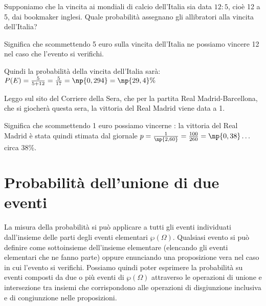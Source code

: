 \begin{exrig}
\begin{esempio}
Supponiamo che la vincita ai mondiali di calcio dell'Italia sia data $12:5$, cioè 12 a 5, dai bookmaker inglesi. Quale probabilità assegnano gli allibratori alla vincita dell'Italia?

Significa che scommettendo 5 euro sulla vincita dell'Italia ne possiamo vincere 12 nel caso che l'evento si verifichi.

Quindi la probabilità della vincita dell'Italia sarà:
$P(E)=\frac 5{5+12}=\frac 5{17}=\np{0,294}=\np{29,4}\%$
\end{esempio}

\begin{esempio}
Leggo sul sito del Corriere della Sera, che per la partita Real Madrid-Barcellona, che si giocherà questa sera, la vittoria del Real Madrid viene data  a 1.

Significa che scommettendo 1 euro possiamo vincerne : la vittoria del Real Madrid è stata quindi stimata dal giornale $p=\frac 1{\np{2,60}}=\frac{100}{260}=\np{0,38}\ldots$ circa 38\%.
\end{esempio}
\end{exrig}
\ovalbox{\risolvii \ref{ese:9.6}, \ref{ese:9.7}, \ref{ese:9.8}, \ref{ese:9.9}, \ref{ese:9.10}, \ref{ese:9.11}, \ref{ese:9.12}, \ref{ese:9.13}, \ref{ese:9.14}, \ref{ese:9.15}, \ref{ese:9.16},}

\vspazio\ovalbox{\ref{ese:9.17}, \ref{ese:9.18}, \ref{ese:9.19}, \ref{ese:9.20}, \ref{ese:9.21}, \ref{ese:9.22}, \ref{ese:9.23}, \ref{ese:9.24}, \ref{ese:9.25}, \ref{ese:9.26}, \ref{ese:9.27}}

\section{Probabilità dell'unione di due eventi}

La misura della probabilità si può applicare a tutti gli eventi individuati dall'insieme delle parti degli eventi elementari $\wp(\Omega)$. Qualsiasi evento si può definire come sottoinsieme dell'insieme elementare (elencando gli eventi elementari che ne fanno parte) oppure enunciando una proposizione vera nel caso in cui l'evento si verifichi. Possiamo quindi poter esprimere la probabilità su eventi composti da due o più eventi di $\wp(\Omega)$ attraverso le operazioni di unione e intersezione tra insiemi che corrispondono alle operazioni di disgiunzione inclusiva e di congiunzione nelle proposizioni.

